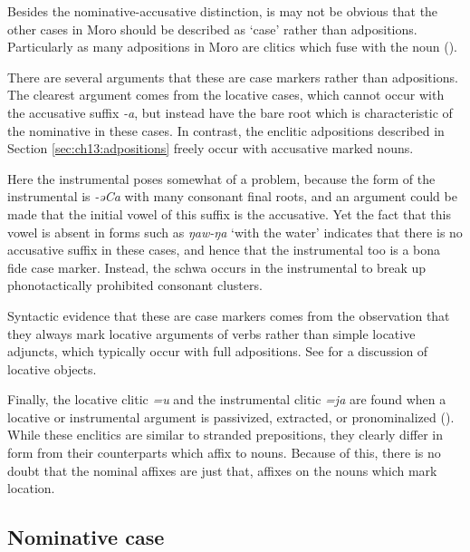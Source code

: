 
Besides the nominative-accusative distinction, is may not be obvious that the other cases in Moro should be described as `case' rather than adpositions. Particularly as many adpositions in Moro are clitics which fuse with the noun (). 

There are several arguments that these are case markers rather than adpositions. The clearest argument comes from the locative cases, which cannot occur with the accusative suffix \textit{-a}, but instead have the bare root which is characteristic of the nominative in these cases. In contrast, the enclitic adpositions described in Section \ref{sec:ch13:adpositions} freely occur with accusative marked nouns.

Here the instrumental poses somewhat of a problem, because the form of the instrumental is \textit{-əCa} with many consonant final roots, and an argument could be made that the initial vowel of this suffix is the accusative. Yet the fact that this vowel is absent in forms such as \textit{ŋaw-ŋa} `with the water' indicates that there is no accusative suffix in these cases, and hence that the instrumental too is a bona fide case marker. Instead, the schwa occurs in the instrumental to break up phonotactically prohibited consonant clusters.
 
Syntactic evidence that these are case markers comes from the observation that they always mark locative arguments of verbs rather than simple locative adjuncts, which typically occur with full adpositions. See  for a discussion of locative objects.

Finally, the locative clitic \textit{=u} and the instrumental clitic \textit{=ja} are found when a locative or instrumental argument is passivized, extracted, or pronominalized (). While these enclitics are similar to stranded prepositions, they clearly differ in form from their counterparts which affix to nouns. Because of this, there is no doubt that the nominal affixes are just that, affixes on the nouns which mark location.


\subsection{Nominative case}\label{section:nominative}

